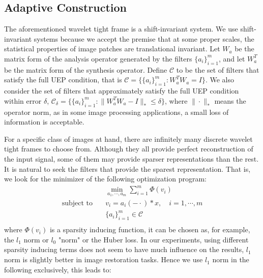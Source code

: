\documentclass[a4paper]{article}
\begin{document}
\subsection{Adaptive Construction}
The aforementioned wavelet tight frame is a shift-invariant system. We use shift-invariant systems because we accept the premise that at some proper scales, the statistical properties of image patches are translational invariant. Let $W_a$ be the matrix form of the analysis operator generated by the filters $\{a_i\}_{i=1}^m$, and let $W^T_a$ be the matrix form of the synthesis operator. Define $\mathcal{C}$ to be the set of filters that satisfy the full UEP condition, that is $\mathcal{C}=\{ \{a_i\}_{i=1}^m : W_a^TW_a=I\}$. We also consider the set of filters that approximately satisfy the full UEP condition within error $\delta$, $\mathcal{C}_\delta = \{\{a_i\}_{i=1}^m : \|W_a^TW_a -I\|_*\leq \delta\}$, where $\| \cdot \|_*$ means the operator norm, as in some image processing applications,  a small loss of information is acceptable.

For a specific class of images at hand, there are infinitely many discrete wavelet tight frames to choose from. Although they all provide perfect reconstruction of the input signal, some of them may provide sparser representations than the rest. It is natural to seek the filters that provide the sparest representation. That is, we look for the minimizer of the following optimization program:
\begin{equation}
\begin{aligned}
	&\min_{a_1,\cdots,a_m} \sum_{i=1}^m\Phi(v_i) \\
	\textrm{subject to} \quad&v_i = a_i(-\cdot)*x,\quad i=1,\cdots,m\\
	 & \{a_i\}_{i=1}^m \in \mathcal{C} \\
\end{aligned}
\end{equation}
where $\Phi(v_i)$ is a sparsity inducing function, it can be chosen as, for example, the $l_1$ norm or $l_0$ "norm" or the Huber loss. In our experiments, using different sparsity inducing terms does not seem to have much influence on the results, $l_1$ norm is slightly better in image restoration tasks. Hence we use $l_1$ norm in the following exclusively, this leads to:
\end{document}
